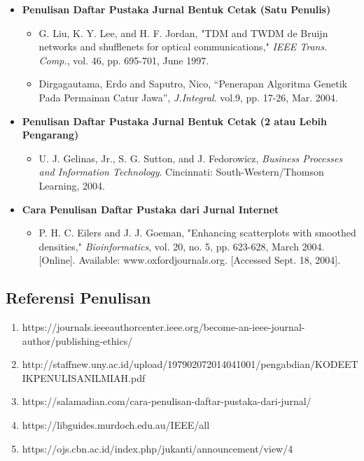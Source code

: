 \documentclass{article}
\begin{document}
\begin{itemize}
    \item \textbf{Penulisan Daftar Pustaka Jurnal Bentuk Cetak (Satu Penulis)}
    \begin{itemize}
        \item G. Liu, K. Y. Lee, and H. F. Jordan, "TDM and TWDM de Bruijn networks and shufflenets for optical communications," \emph{IEEE Trans. Comp.}, vol. 46, pp. 695-701, June 1997.
        \item Dirgagautama, Erdo and Saputro, Nico, “Penerapan Algoritma Genetik Pada Permainan Catur Jawa”, \emph{J.Integral}. vol.9, pp. 17-26, Mar. 2004. \cite{Jukanti}
    \end{itemize}
    \item \textbf{Penulisan Daftar Pustaka Jurnal Bentuk Cetak (2 atau Lebih Pengarang)}
    \begin{itemize}
        \item U. J. Gelinas, Jr., S. G. Sutton, and J. Fedorowicz, \emph{Business Processes and Information Technology}. Cincinnati: South-Western/Thomson Learning, 2004. \cite{IEEErefguide}
    \end{itemize}
    \item \textbf{Cara Penulisan Daftar Pustaka dari Jurnal Internet}
    \begin{itemize}
        \item P. H. C. Eilers and J. J. Goeman, "Enhancing scatterplots with smoothed densities," \emph{Bioinformatics}, vol. 20, no. 5, pp. 623-628, March 2004. [Online]. Available: www.oxfordjournals.org. [Accessed Sept. 18, 2004].\cite{IEEErefguide}
    \end{itemize}
\end{itemize}

\subsection{Referensi Penulisan}

\begin{enumerate}
    \item https://journals.ieeeauthorcenter.ieee.org/become-an-ieee-journal-author/publishing-ethics/
    \item http://staffnew.uny.ac.id/upload/197902072014041001/pengabdian/KODEETIKPENULISANILMIAH.pdf
    \item https://salamadian.com/cara-penulisan-daftar-pustaka-dari-jurnal/
    \item https://libguides.murdoch.edu.au/IEEE/all
    \item https://ojs.cbn.ac.id/index.php/jukanti/announcement/view/4
\end{enumerate}
\end{document}
